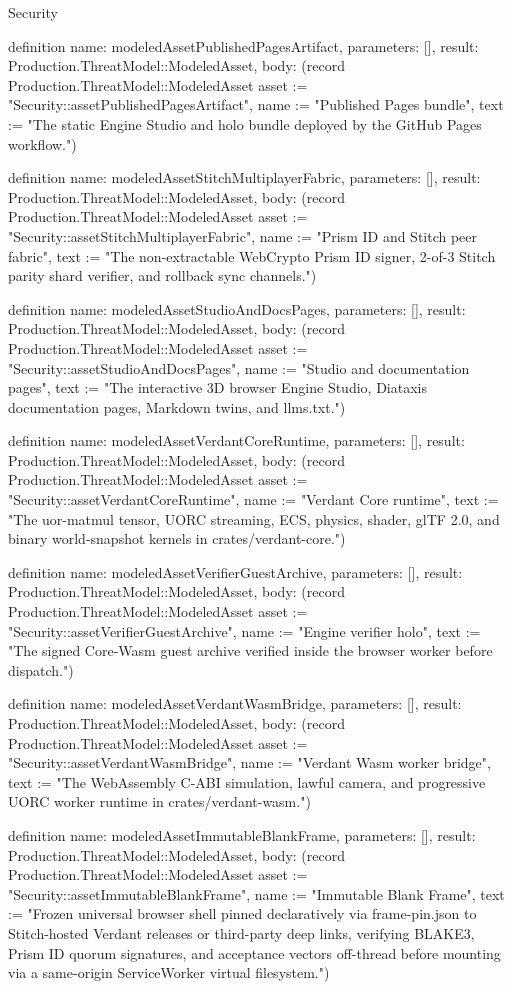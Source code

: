 \begin{lexlean}{Security}
\begin{semanticmodule}
definition{
  name: modeledAssetPublishedPagesArtifact,
  parameters: [],
  result: Production.ThreatModel::ModeledAsset,
  body: (record Production.ThreatModel::ModeledAsset {asset := "Security::assetPublishedPagesArtifact", name := "Published Pages bundle", text := "The static Engine Studio and holo bundle deployed by the GitHub Pages workflow."})
}

definition{
  name: modeledAssetStitchMultiplayerFabric,
  parameters: [],
  result: Production.ThreatModel::ModeledAsset,
  body: (record Production.ThreatModel::ModeledAsset {asset := "Security::assetStitchMultiplayerFabric", name := "Prism ID and Stitch peer fabric", text := "The non-extractable WebCrypto Prism ID signer, 2-of-3 Stitch parity shard verifier, and rollback sync channels."})
}

definition{
  name: modeledAssetStudioAndDocsPages,
  parameters: [],
  result: Production.ThreatModel::ModeledAsset,
  body: (record Production.ThreatModel::ModeledAsset {asset := "Security::assetStudioAndDocsPages", name := "Studio and documentation pages", text := "The interactive 3D browser Engine Studio, Diataxis documentation pages, Markdown twins, and llms.txt."})
}

definition{
  name: modeledAssetVerdantCoreRuntime,
  parameters: [],
  result: Production.ThreatModel::ModeledAsset,
  body: (record Production.ThreatModel::ModeledAsset {asset := "Security::assetVerdantCoreRuntime", name := "Verdant Core runtime", text := "The uor-matmul tensor, UORC streaming, ECS, physics, shader, glTF 2.0, and binary world-snapshot kernels in crates/verdant-core."})
}

definition{
  name: modeledAssetVerifierGuestArchive,
  parameters: [],
  result: Production.ThreatModel::ModeledAsset,
  body: (record Production.ThreatModel::ModeledAsset {asset := "Security::assetVerifierGuestArchive", name := "Engine verifier holo", text := "The signed Core-Wasm guest archive verified inside the browser worker before dispatch."})
}

definition{
  name: modeledAssetVerdantWasmBridge,
  parameters: [],
  result: Production.ThreatModel::ModeledAsset,
  body: (record Production.ThreatModel::ModeledAsset {asset := "Security::assetVerdantWasmBridge", name := "Verdant Wasm worker bridge", text := "The WebAssembly C-ABI simulation, lawful camera, and progressive UORC worker runtime in crates/verdant-wasm."})
}

definition{
  name: modeledAssetImmutableBlankFrame,
  parameters: [],
  result: Production.ThreatModel::ModeledAsset,
  body: (record Production.ThreatModel::ModeledAsset {asset := "Security::assetImmutableBlankFrame", name := "Immutable Blank Frame", text := "Frozen universal browser shell pinned declaratively via frame-pin.json to Stitch-hosted Verdant releases or third-party deep links, verifying BLAKE3, Prism ID quorum signatures, and acceptance vectors off-thread before mounting via a same-origin ServiceWorker virtual filesystem."})
}


\end{semanticmodule}
\end{lexlean}
